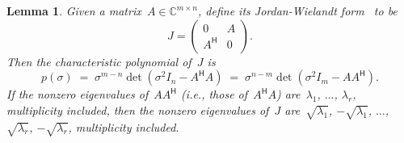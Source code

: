 \documentclass[11pt,a4paper]{article}  %
\numberwithin{equation}{section}
\newtheorem{lemma}{Lemma}%
\theoremstyle{definition}
\def\CC{\mathbb{C}}
\newcommand{\hmt}{{\scriptscriptstyle{{\mathsf{H}}}}}
\begin{document}
\begin{lemma}
  \label{lem:lanczos}
  Given a matrix~$A \in \CC^{m\times n}$, define its Jordan-Wielandt form~\cite{Mathias_2013} to be
\begin{equation}
  \label{eq:JW}
  J =
  \begin{pmatrix}
    0 & A \\
    A^\hmt & 0
  \end{pmatrix}.
\end{equation}
 Then the characteristic polynomial of~$J$ is
    \begin{equation}
      \label{eq:chp}
      p(\sigma) \;=\; \sigma^{m-n}\det(\sigma^2 I_n - A^\hmt A) \;=\; \sigma^{n-m}\det(\sigma^2 I_m
      - A A^\hmt).
    \end{equation}
    If the nonzero eigenvalues of~$AA^\hmt$ \textnormal{(}i.e., those of~$A^\hmt A$\textnormal{)}
    are~$\lambda_1$, $\dots$, $\lambda_r$, multiplicity included, then
    the nonzero eigenvalues of~$J$ are~$\sqrt{\lambda_1}$, $-\sqrt{\lambda_1}$, $\dots$, $\sqrt{\lambda_r}$,
    $-\sqrt{\lambda_r}$, multiplicity included.

\end{lemma}
\end{document}
